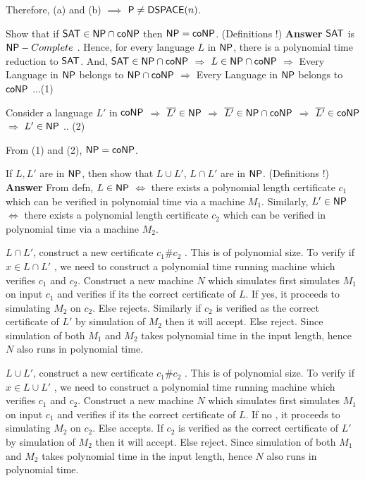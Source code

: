 \documentclass[addpoints,12pt]{exam}
\begin{document}
\begin{questions}
Therefore, (a) and (b) $\implies$ ${\mathsf{P}} \neq {\ensuremath{\mathsf{DSPACE}}}(n)$.

\question[5]
Show that if ${\mathsf{SAT}} \in {\ensuremath{\mathsf{NP}}} \cap {\ensuremath{\mathsf{co}}}{\ensuremath{\mathsf{NP}}}$ then ${\mathsf{NP}} = {\mathsf{co}}{\mathsf{NP}}$. (Definitions !) \newline
\textbf{Answer} \newline
${\mathsf{SAT}}$ is ${\mathsf{NP}}-Complete$ . Hence, for every language $L$ in ${\mathsf{NP}}$, there is a polynomial time reduction to ${\mathsf{SAT}}$. And,
${\mathsf{SAT}} \in {\ensuremath{\mathsf{NP}}} \cap {\ensuremath{\mathsf{co}}}{\ensuremath{\mathsf{NP}}}$ $\Longrightarrow$ $L \in {\ensuremath{\mathsf{NP}}} \cap {\ensuremath{\mathsf{co}}}{\ensuremath{\mathsf{NP}}}$ $\Longrightarrow$ Every Language in ${\mathsf{NP}}$ belongs to ${\mathsf{NP}} \cap {\ensuremath{\mathsf{co}}}{\ensuremath{\mathsf{NP}}}$ $\Longrightarrow$ Every Language in ${\mathsf{NP}}$
 belongs to ${\mathsf{co}}{\mathsf{NP}}$ ...(1) \newline
 
 Consider a language $L'$ in ${\mathsf{co}}{\mathsf{NP}}$ $\Longrightarrow$ $\overline{L'} \in {\ensuremath{\mathsf{NP}}}$ $\Longrightarrow$ $\overline{L'} \in {\ensuremath{\mathsf{NP}}} \cap {\ensuremath{\mathsf{co}}}{\ensuremath{\mathsf{NP}}}$
 $\Longrightarrow$ $\overline{L'} \in {\ensuremath{\mathsf{co}}}{\ensuremath{\mathsf{NP}}}$ $\Longrightarrow$ $L' \in {\ensuremath{\mathsf{NP}}}$ .. (2)
 
 From (1) and (2), ${\mathsf{NP}} = {\mathsf{co}}{\mathsf{NP}}$.


\question[5]
If $L, L'$ are in ${\mathsf{NP}}$, then show that $L \cup L'$, $L \cap L'$ are in ${\mathsf{NP}}$. (Definitions !) \newline
\textbf{Answer} \newline
From defn, $L \in {\ensuremath{\mathsf{NP}}}$ $\Leftrightarrow$ there exists a polynomial length certificate $c_{1}$ which can be verified in polynomial time via a machine $M_{1}$. \newline
Similarly, $L' \in {\ensuremath{\mathsf{NP}}}$ $\Leftrightarrow$ there exists a polynomial length certificate $c_{2}$ which can be verified in polynomial time via a machine $M_{2}$. \newline

$L \cap L'$, construct a new certificate $c_{1}\#c_{2}$ . This is of polynomial size. To verify if $x \in L \cap L'$ , we need to construct a polynomial time running machine
which verifies $c_{1}$ and $c_{2}$. Construct a new machine $N$ which simulates first simulates $M_{1}$ on input $c_{1}$ and verifies if its the correct certificate of $L$.
If yes, it proceeds to simulating $M_{2}$ on $c_{2}$. Else rejects. Similarly if $c_{2}$ is verified as the correct certificate of $L'$ by simulation of $M_{2}$ then it will accept. Else reject.
Since simulation of both $M_{1}$ and $M_{2}$ takes polynomial time in the input length, hence $N$ also runs in polynomial time. \newline

$L \cup L'$, construct a new certificate $c_{1}\#c_{2}$ . This is of polynomial size. To verify if $x \in L \cup L'$ , we need to construct a polynomial time running machine
which verifies $c_{1}$ and $c_{2}$. Construct a new machine $N$ which simulates first simulates $M_{1}$ on input $c_{1}$ and verifies if its the correct certificate of $L$.
If no , it proceeds to simulating $M_{2}$ on $c_{2}$. Else accepts. If $c_{2}$ is verified as the correct certificate of $L'$ by simulation of $M_{2}$ then it will accept. Else reject.
Since simulation of both $M_{1}$ and $M_{2}$ takes polynomial time in the input length, hence $N$ also runs in polynomial time.


\end{questions}
\end{document}
